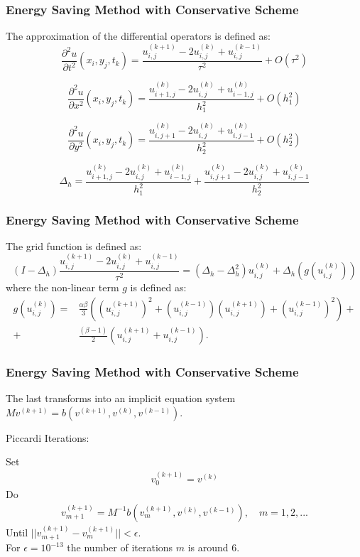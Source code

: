 \documentclass{beamer}
\begin{document}
\begin{frame}
\frametitle{Energy Saving Method with Conservative Scheme}


The approximation of the differential operators is defined as:
\begin{equation}
\frac{\partial^2 u}{\partial t^2}(x_i, y_j, t_k ) = \frac{ u^{(k+1)}_{i, j} - 2u^{(k)}_{i,j} + u^{(k-1)}_{i,j} }{\tau^2} + O(\tau^2) 
\end{equation}

\begin{equation}
\frac{\partial^2 u}{\partial x^2}(x_i, y_j, t_k ) = \frac{ u^{(k)}_{i+1, j} - 2u^{(k)}_{i,j} + u^{(k)}_{i-1,j} }{h_1^2} + O(h_1^2) 
\end{equation}

\begin{equation}
\frac{\partial^2 u}{\partial y^2}(x_i, y_j, t_k ) = \frac{ u^{(k)}_{i, j+1} - 2u^{(k)}_{i,j} + u^{(k)}_{i,j-1} }{h_2^2} + O(h_2^2) 
\end{equation}


\begin{equation}
\Delta_h = \frac{ u^{(k)}_{i+1, j} - 2u^{(k)}_{i,j} + u^{(k)}_{i-1,j} }{h_1^2} + \frac{ u^{(k)}_{i, j+1} - 2u^{(k)}_{i,j} + u^{(k)}_{i,j-1} }{h_2^2}
\end{equation}

\end{frame}

\begin{frame}
\frametitle{Energy Saving Method with Conservative Scheme}
The grid function is defined as:
\begin{equation}
(I-\Delta_h)\frac{ u^{(k+1)}_{i, j} - 2u^{(k)}_{i,j} + u^{(k-1)}_{i,j} }{\tau^2} = (\Delta_h - \Delta_h^2)u^{(k)}_{i,j} + \Delta_h(g(u^{(k)}_{i,j}))
\end{equation}
%
where the non-linear term $g$ is defined as:
\begin{align}
g(u^{(k)}_{i,j})=&\frac{\alpha \beta} { 3 } \left( (u^{(k+1)}_{i,j})^2 + (u^{(k-1)}_{i,j})(u^{(k+1)}_{i,j}) + (u^{(k-1)}_{i,j})^2 \right) + \nonumber\\
+&\frac{ (\beta - 1 )}{ 2 }\left( u^{(k+1)}_{i,j} + u^{(k-1)}_{i,j} \right).
\end{align}


\end{frame}

\begin{frame}
\frametitle{Energy Saving Method with Conservative Scheme}
The last transforms into an implicit equation system $M v^{(k+1)} = b( v^{(k+1)} ,  v^{(k)} ,  v^{(k-1)}  )$.

Piccardi  Iterations:

Set
\begin{align}
 v^{(k+1)}_0 =  v^{(k)}
\end{align}
Do
\begin{align}
 v^{(k+1)}_{m+1} =  M^{-1}  b( v^{(k+1)}_{m} ,  v^{(k)} , v^{(k-1)}  ), \quad m=1,2, ...
\end{align}
Until $||  v^{(k+1)}_{m+1} -  v^{(k+1)}_{m}|| < \epsilon$. 
\\
For $\epsilon = 10^{-13}$ the number of iterations $m$ is around 6.
\end{frame}
\end{document}
